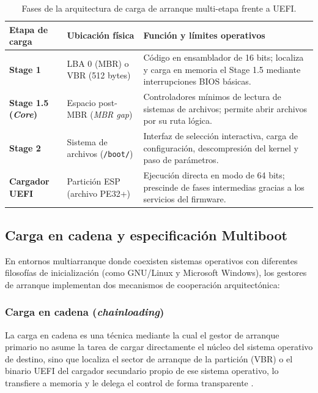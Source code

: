 \documentclass[12pt]{article}
\begin{document}
\begin{table}[!t]
\centering
\small
\renewcommand{\arraystretch}{1.1}
\renewcommand{\tabularxcolumn}[1]{m{#1}}
\setlength{\emergencystretch}{1.5em}
\caption{Fases de la arquitectura de carga de arranque multi-etapa frente a UEFI.}
\label{tab:fasesCargaArranque}
\begin{tabularx}{\textwidth}{>{\centering\arraybackslash}m{2.8cm} >{\centering\arraybackslash}m{2.4cm} X}
\toprule
\textbf{Etapa de carga} & \textbf{Ubicación física} & \textbf{Función y límites operativos} \\
\midrule
\textbf{Stage 1} & LBA 0 (MBR) o VBR (512 bytes) & Código en ensamblador de 16 bits; localiza y carga en memoria el Stage 1.5 mediante interrupciones BIOS básicas. \\
\addlinespace
\textbf{Stage 1.5 (\textit{Core})} & Espacio post-MBR (\textit{MBR gap}) & Controladores mínimos de lectura de sistemas de archivos; permite abrir archivos por su ruta lógica. \\
\addlinespace
\textbf{Stage 2} & Sistema de archivos (\texttt{/boot/}) & Interfaz de selección interactiva, carga de configuración, descompresión del kernel y paso de parámetros. \\
\addlinespace
\textbf{Cargador UEFI} & Partición ESP (archivo PE32+) & Ejecución directa en modo de 64 bits; prescinde de fases intermedias gracias a los servicios del firmware. \\
\bottomrule
\end{tabularx}
\end{table}

\subsection{Carga en cadena y especificación Multiboot}
\label{subsec:cargaCadenaMultiboot}

En entornos multiarranque donde coexisten sistemas operativos con diferentes filosofías de inicialización (como GNU/Linux y Microsoft Windows), los gestores de arranque implementan dos mecanismos de cooperación arquitectónica:

\subsubsection{Carga en cadena (\textit{chainloading})}

La carga en cadena es una técnica mediante la cual el gestor de arranque primario no asume la tarea de cargar directamente el núcleo del sistema operativo de destino, sino que localiza el sector de arranque de la partición (VBR) o el binario UEFI del cargador secundario propio de ese sistema operativo, lo transfiere a memoria y le delega el control de forma transparente \parencite{gnugrub2024manual}.
\end{document}
